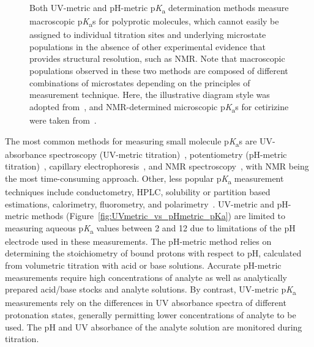 \documentclass[9pt,lineno]{elife}
\newcommand{\pKa}{p\textit{K}\textsubscript{a}}
\begin{document}
\begin{figure}
\begin{center}
{Both UV-metric and pH-metric \pKa{} determination methods measure macroscopic \pKa{}s for polyprotic molecules, which cannot easily be assigned to individual titration sites and underlying microstate populations in the absence of other experimental evidence that provides structural resolution, such as NMR. 
Note that macroscopic populations observed in these two methods are composed of different combinations of microstates depending on the principles of measurement technique.
Here, the illustrative diagram style was adopted from~\citep{rupp_predicting_2011}, and NMR-determined microscopic \pKa{}s for cetirizine were taken from~\citep{marosi_triprotic_2009}. 
}
\label{fig:micro_vs_macro_pKa}
\end{center}
\end{figure}

The most common methods for measuring small molecule \pKa{}s are UV-absorbance spectroscopy (UV-metric titration)~\citep{tam_multi-wavelength_2001, allen_multiwavelength_1998,comer_ionization_2014}, potentiometry (pH-metric titration)~\citep{avdeef_ph-metric_1999,comer_ionization_2014}, capillary electrophoresis~\citep{cabot_novel_2015, wan_rapid_2002}, and NMR spectroscopy~\citep{bezencon_pka_2014}, with NMR being the most time-consuming approach. 
Other, less popular \pKa{} measurement techniques include conductometry, HPLC, solubility or partition based estimations, calorimetry, fluorometry, and polarimetry~\citep{reijenga_development_2013}. 
UV-metric and pH-metric methods (Figure~\ref{fig:UVmetric_vs_pHmetric_pKa}) are limited to measuring aqueous \pKa{} values between 2 and 12 due to limitations of the pH electrode used in these measurements.
The pH-metric method relies on determining the stoichiometry of bound protons with respect to pH, calculated from volumetric titration with acid or base solutions. Accurate pH-metric measurements require high concentrations of analyte as well as analytically prepared acid/base stocks and analyte solutions. 
By contrast, UV-metric \pKa{} measurements rely on the differences in UV absorbance spectra of different protonation states, generally permitting lower concentrations of analyte to be used.
The pH and UV absorbance of the analyte solution are monitored during titration. 
\end{document}
